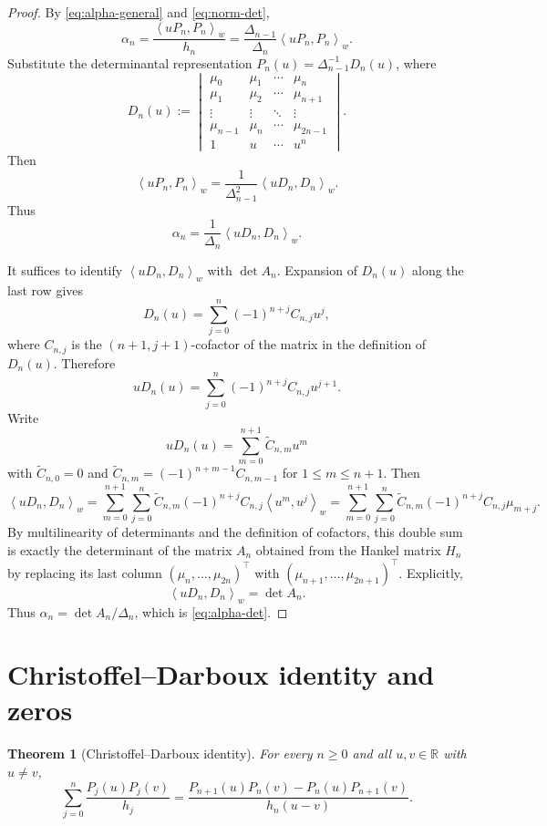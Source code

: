 \documentclass[11pt]{amsart}
\numberwithin{equation}{section}
\newtheorem{theorem}{Theorem}[section]
\theoremstyle{definition}
\newcommand{\R}{\mathbb{R}}
\newcommand{\mom}[1]{\mu_{#1}}
\newcommand{\Hankel}[1]{H_{#1}}
\newcommand{\DeltaH}[1]{\Delta_{#1}}
\newcommand{\inner}[2]{\left\langle #1,#2\right\rangle_{w}}
\begin{document}
\begin{proof}
By \eqref{eq:alpha-general} and \eqref{eq:norm-det},
\[
\alpha_{n}
=\frac{\inner{uP_{n}}{P_{n}}}{h_{n}}
=\frac{\DeltaH{n-1}}{\DeltaH{n}}\inner{uP_{n}}{P_{n}}.
\]
Substitute the determinantal representation $P_{n}(u)=\DeltaH{n-1}^{-1}D_{n}(u)$,
where
\[
D_{n}(u)
:=
\begin{vmatrix}
\mom{0} & \mom{1} & \cdots & \mom{n}\\
\mom{1} & \mom{2} & \cdots & \mom{n+1}\\
\vdots  & \vdots  & \ddots & \vdots\\
\mom{n-1} & \mom{n} & \cdots & \mom{2n-1}\\
1 & u & \cdots & u^{n}
\end{vmatrix}.
\]
Then
\[
\inner{uP_{n}}{P_{n}}
=\frac{1}{\DeltaH{n-1}^{2}}\inner{uD_{n}}{D_{n}}.
\]
Thus
\[
\alpha_{n}
=\frac{1}{\DeltaH{n}}\inner{uD_{n}}{D_{n}}.
\]

It suffices to identify $\inner{uD_{n}}{D_{n}}$ with $\det A_{n}$. Expansion
of $D_{n}(u)$ along the last row gives
\[
D_{n}(u)
=\sum_{j=0}^{n}(-1)^{n+j}C_{n,j}u^{j},
\]
where $C_{n,j}$ is the $(n+1,j+1)$-cofactor of the matrix in the definition
of $D_{n}(u)$. Therefore
\[
uD_{n}(u)
=\sum_{j=0}^{n}(-1)^{n+j}C_{n,j}u^{j+1}.
\]
Write
\[
uD_{n}(u)
=\sum_{m=0}^{n+1}\widetilde{C}_{n,m}u^{m}
\]
with $\widetilde{C}_{n,0}=0$ and $\widetilde{C}_{n,m}=(-1)^{n+m-1}C_{n,m-1}$
for $1\le m\le n+1$. Then
\[
\inner{uD_{n}}{D_{n}}
=\sum_{m=0}^{n+1}\sum_{j=0}^{n}\widetilde{C}_{n,m}(-1)^{n+j}C_{n,j}\inner{u^{m}}{u^{j}}
=\sum_{m=0}^{n+1}\sum_{j=0}^{n}\widetilde{C}_{n,m}(-1)^{n+j}C_{n,j}\mom{m+j}.
\]
By multilinearity of determinants and the definition of cofactors, this double
sum is exactly the determinant of the matrix $A_{n}$ obtained from the
Hankel matrix $\Hankel{n}$ by replacing its last column
$(\mom{n},\dots,\mom{2n})^{\top}$ with $(\mom{n+1},\dots,\mom{2n+1})^{\top}$.
Explicitly,
\[
\inner{uD_{n}}{D_{n}}=\det A_{n}.
\]
Thus $\alpha_{n}=\det A_{n}/\DeltaH{n}$, which is \eqref{eq:alpha-det}.
\end{proof}

\section{Christoffel--Darboux identity and zeros}

\begin{theorem}[Christoffel--Darboux identity]\label{thm:CD}
For every $n\ge 0$ and all $u,v\in\R$ with $u\neq v$,
\begin{equation}\label{eq:CD}
\sum_{j=0}^{n}\frac{P_{j}(u)P_{j}(v)}{h_{j}}
=\frac{P_{n+1}(u)P_{n}(v)-P_{n}(u)P_{n+1}(v)}{h_{n}(u-v)}.
\end{equation}
\end{theorem}
\end{document}
